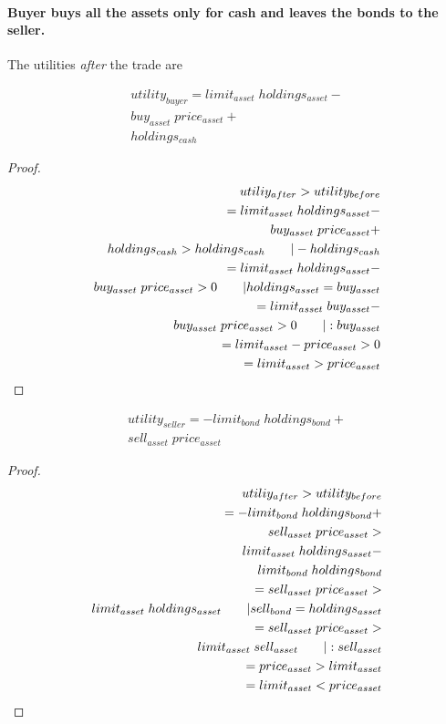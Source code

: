 \documentclass[Bachelorarbeit.tex]{subfiles}
\begin{document}
\paragraph{Buyer buys all the assets only for cash and leaves the bonds to the seller.}
The utilities \textit{after} the trade are

\begin{align*}
	utility_{buyer} = limit_{asset} \; holdings_{asset} - \\
				buy_{asset} \; price_{asset} + \\
				holdings_{cash}
\end{align*}

\begin{proof}
\begin{align*}
	utiliy_{after} > utility_{before} 
		\\ = limit_{asset} \; holdings_{asset} - \\
			buy_{asset} \; price_{asset} + \\
			holdings_{cash} > holdings_{cash}		\tag*{$| -holdings_{cash}$}
		\\ = limit_{asset} \; holdings_{asset} - \\
			buy_{asset} \; price_{asset} > 0		\tag*{$| holdings_{asset} = buy_{asset}$}
		\\ = limit_{asset} \; buy_{asset} - \\
			buy_{asset} \; price_{asset} > 0		\tag*{$|:buy_{asset}$}
		\\ = limit_{asset} - price_{asset} > 0
		\\ = limit_{asset} > price_{asset}			
\end{align*}
\end{proof}

\begin{align*}
	utility_{seller} = -limit_{bond} \; holdings_{bond} + \\
				sell_{asset} \; price_{asset}
\end{align*}

\begin{proof}
\begin{align*}
	utiliy_{after} > utility_{before} 
		\\ = -limit_{bond} \; holdings_{bond} + \\
				sell_{asset} \; price_{asset} > \\
				limit_{asset} \; holdings_{asset} - \\
				limit_{bond} \; holdings_{bond} 		
		\\ = sell_{asset} \; price_{asset} > \\
				limit_{asset} \; holdings_{asset}		\tag*{$| sell_{bond} = holdings_{asset}$}
		\\ = sell_{asset} \; price_{asset} > \\
				limit_{asset} \; sell_{asset}			\tag*{$|:sell_{asset}$}
		\\ =  price_{asset} > limit_{asset}		
		\\ =  limit_{asset}	< price_{asset}	
\end{align*}
\end{proof}
	
\end{document}
